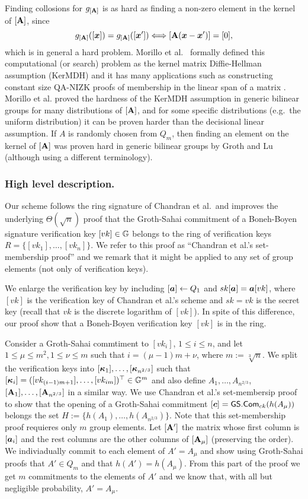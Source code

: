  Finding collosions for $g_{[\mathbf{{A}}]}$ is as hard as finding a non-zero element in the kernel of $[\mathbf{{A}}]$, since
$$
g_{[\mathbf{{A}}]}([{\boldsymbol{x}}]) = g_{[\mathbf{{A}}]}([{\boldsymbol{x}}']) \Longleftrightarrow [\mathbf{{A}}({\boldsymbol{x}}-{\boldsymbol{x}}')]=[0],
$$
which is in general a hard problem.
Morillo et al.~\cite{AC:MorRafVil16} formally defined this computational (or search) problem as the kernel matrix Diffie-Hellman assumption (KerMDH) and it has many applications such as constructing constant size QA-NIZK proofs of membership in the linear span of a matrix \cite{EC:LPJY14,EC:KilWee15}. Morillo et al. proved the hardness of the KerMDH assumption in generic bilinear groups for many distributions of $[\mathbf{{A}}]$, and for some specific distributions (e.g.~the uniform distribution) it can be proven harder than the decisional linear assumption. If $A$ is randomly chosen from $Q_m$, then finding an element on the kernel of $[\mathbf{{A}}]$ was proven hard in generic bilinear groups by Groth and Lu \cite{AC:GroLu07} (although using a different terminology).

\subsubsection{High level description.}
Our scheme follows the ring signature of Chandran et al.~and improves the underlying $\Theta(\sqrt{n})$ proof that the Groth-Sahai commitment of a Boneh-Boyen signature verification key $[vk]\in\mathbb{G}$ belongs to the ring of verification keys $R=\{[vk_1],\ldots,[vk_n]\}$. We refer to this proof as ``Chandran et al.'s set-membership proof'' and we remark that it might be applied to any set of group elements (not only of verification keys).

We enlarge the verification key by including $[{\boldsymbol{a}}]\gets Q_1$ and $sk[{\boldsymbol{a}}]={\boldsymbol{a}}[vk]$, where $[vk]$ is the verification key of Chandran et al.'s scheme and $sk=vk$ is the secret key (recall that $vk$ is the discrete logarithm of $[vk]$). In spite of this difference, our proof show that a Boneh-Boyen verification key $[vk]$ is in the ring. 

Consider a Groth-Sahai commtiment to $[vk_i]$, $1\leq i\leq n$, and let $1\leq \mu\leq m^2, 1\leq \nu \leq m$  such that $i=(\mu-1)m + \nu$, where $m:=\sqrt[3]{n}$. We split the verification keys into $[{\boldsymbol{\kappa}}_1],\ldots, [{\boldsymbol{\kappa}}_{n^{2/3}}]$ such that $[{\boldsymbol{\kappa}}_i] = ([vk_{(i-1)m+1}],\ldots,[vk_{im}])^\top\in\mathbb{G}^m$ and also define $A_1,\ldots, A_{n^{2/3}}$, $[\mathbf{{A}}_1],\ldots, [\mathbf{{A}}_{n^{2/3}}]$ in a similar way.
We use Chandran et al.'s set-membersip proof to show that the opening of a Groth-Sahai commitment $[{\boldsymbol{c}}] = {\mathsf{GS}}.\mathsf{Com}_{ck}(h(A_ \mu))$ belongs the set $H:=\{h(A_1),\ldots,\allowbreak h(A_{n^{2/3}})\}$. Note that this set-membership proof requieres only $m$ group elements.
Let $[\mathbf{{A}}']$ the matrix whose first column is $[{\boldsymbol{a}}_i]$ and the rest columns are the other columns of $[\mathbf{{A}}_\mu]$ (preserving the order). We indiviadually commit to each element of $A'=A_\mu$ and show using Groth-Sahai proofs that $A'\in Q_m$ and that $h(A')=h(A_\mu)$. From this part of the proof we get $m$ commitments to the elements of $A'$ and we know that, with all but negligible probability, $A'=A_\mu$.

